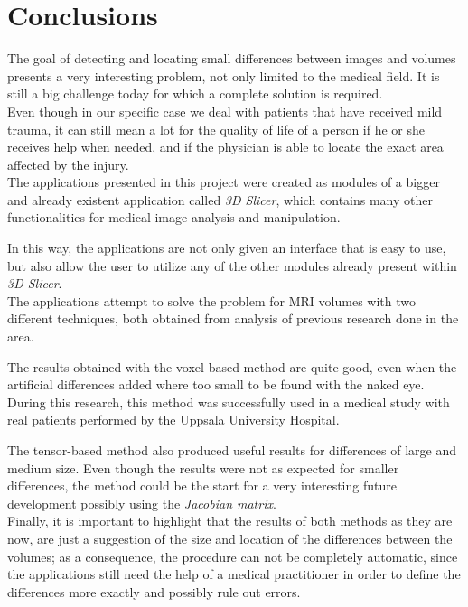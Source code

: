 \chapter{Conclusions}

The goal of detecting and locating small differences between images
and volumes presents a very interesting problem, not only limited to
the medical field. It is still a big challenge today for which a
complete solution is required.\\

Even though in our specific case we deal with patients that have
received mild trauma, it can still mean a lot for the quality of life
of a person if he or she receives help when needed, and if the
physician is able to locate the exact area affected by the injury.\\

The applications presented in this project were created as modules of
a bigger and already existent application called \textit{3D Slicer},
which contains many other functionalities for medical image analysis
and manipulation.

In this way, the applications are not only given an interface that is
easy to use, but also allow the user to utilize any of the
other modules already present within \textit{3D Slicer}.\\

The applications attempt to solve the problem for MRI volumes with two
different techniques, both obtained from analysis of previous research
done in the area.

The results obtained with the voxel-based method are quite good, even
when the artificial differences added where too small to be found with
the naked eye. During this research, this method was successfully used
in a medical study with real patients performed by the Uppsala
University Hospital.

The tensor-based method also produced useful results for differences
of large and medium size. Even though the results were not as expected
for smaller differences, the method could be the start for a very
interesting future development possibly using the \textit{Jacobian
  matrix}.\\

Finally, it is important to highlight that the results of both methods
as they are now, are just a suggestion of the size and location of the
differences between the volumes; as a consequence, the procedure can
not be completely automatic, since the applications still need the
help of a medical practitioner in order to define the differences more
exactly and possibly rule out errors.


